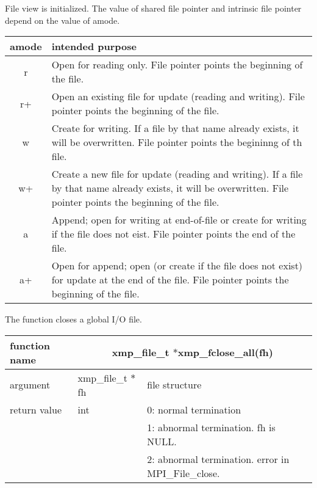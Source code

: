    File view is initialized. The value of shared file pointer and intrinsic file
   pointer depend on the value of amode.

   \begin{table}
     \begin{center}
    \label{tb:xxx}
    \begin{tabular}{|c|p{120mm}|}
      \hline
     amode & intended purpose \\ \hline \hline
     r &  Open for reading only. File pointer points the beginning of
	 the file.\\ \hline
     r+ & Open an existing file for update (reading and writing). File
	 pointer points the beginning of the file. \\ \hline
     w &  Create for writing. If a file by that name already exists, it
	 will be overwritten. File pointer points the begininng of th file. \\ \hline
     w+ & Create a new file for update (reading and writing). If a file
	 by that name already exists, it will be overwritten. File
	 pointer points the beginning of the file. \\ \hline
     a & Append; open for writing at end-of-file or create for writing
	 if the file does not eist. File pointer points the end of the file. \\ \hline
     a+ & Open for append; open (or create if the file does not exist)
	 for update at the end of the file. File pointer points the
	 beginning of the file. \\ \hline
    \end{tabular}
   \end{center}
   \end{table}


   \clearpage
   [CLOSE]

   The function closes a global I/O file.

   \begin{table}[h]
    \begin{center}
     \begin{tabular}{|l|l|p{80mm}|}
      \hline
      {\bf function name}  & \multicolumn{2}{c|}{\bf xmp\_file\_t
      $*$xmp\_fclose\_all(fh)} \\ \hline \hline
      argument & xmp\_file\_t $*$fh & file structure \\ \hline
      return value & int & 0: normal termination \\
      &  & 1: abnormal termination. fh is NULL. \\
      &  & 2: abnormal termination. error in MPI\_File\_close. \\ \hline
      \end{tabular}
     \end{center}
    \label{tb:close}
   \end{table}

